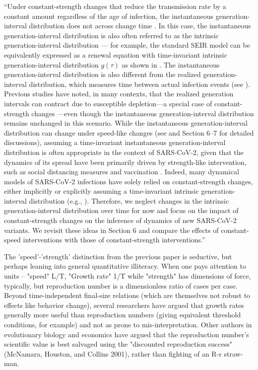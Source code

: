 \documentclass[12pt]{article}
\newcommand{\revtext}{\textsf}
\begin{document}
``Under constant-strength changes that reduce the transmission rate by a constant amount regardless of the age of infection, the instantaneous generation-interval distribution does not across change time \citep{fraser2007estimating}.
In this case, the instantaneous generation-interval distribution is also often referred to as the intrinsic generation-interval distribution \citep{champredon2015intrinsic,champredon2018two,gostic2020practical,park2020time}---
for example, the standard SEIR model can be equivalently expressed as a renewal equation with time-invariant intrinsic generation-interval distribution $g(\tau)$ as shown in \citep{champredon2018equivalence}.
The instantaneous generation-interval distribution is also different from the realized generation-interval distribution, which measures time between actual infection events (see \citep{champredon2015intrinsic}).
Previous studies have noted, in many contexts, that the realized generation intervals can contract due to susceptible depletion---a special case of constant-strength changes \citep{kenah2008generation,nishiura2010time,champredon2015intrinsic}---even though the instantaneous generation-interval distribution remains unchanged in this scenario.
While the instantaneous generation-interval distribution can change under speed-like changes (see \cite{fraser2007estimating} and Section 6--7 for detailed discussions), assuming a time-invariant instantaneous generation-interval distribution is often appropriate in the context of SARS-CoV-2, given that the dynamics of its spread have been primarily driven by strength-like intervention, such as social distancing measures \citep{flaxman2020Rt} and vaccination \citep{moore2021vaccination}.
Indeed, many dynamical models of SARS-CoV-2 infections have solely relied on constant-strength changes, either implicitly or explicitly assuming a time-invariant intrinsic generation-interval distribution (e.g., \citep{flaxman2020Rt,gostic2020practical,brauner2021inferring}).
Therefore, we neglect changes in the intrinsic generation-interval distribution over time for now and focus on the impact of constant-strength changes on the inference of dynamics of new SARS-CoV-2 variants.
We revisit these ideas in Section 6 and compare the effects of constant-speed interventions with those of constant-strength interventions.''

\revtext{The 'speed'-'strength' distinction from the previous paper is seductive, but perhaps leaning into general quantitative illiteracy.  When one pays attention to units -- "speed" L/T,  "Growth rate" 1/T while "strength" has dimensions of force, typically, but reproduction number is a dimensionless ratio of cases per case.  Beyond time-independent final-size relations (which are themselves not robust to effects like behavior change), several researchers have argued that growth rates generally more useful than reproduction numbers (giving equivalent threshold conditions, for example) and not as prone to mis-interpretation.  Other authors in evolutionary biology and economics have argued that the reproduction number's scientific value is best salvaged using the "discounted reproduction success" (McNamara, Houston, and Collins 2001), rather than fighting of an R-r straw-man.}
\end{document}
